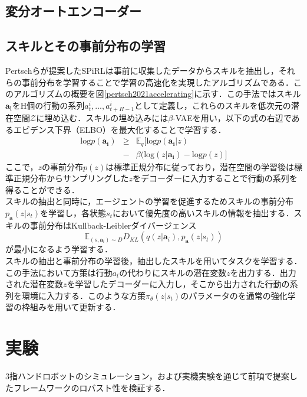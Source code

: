 \documentclass[dvipdfmx]{ampbt_nomag}
\begin{document}
\subsection{変分オートエンコーダー}


\subsection{スキルとその事前分布の学習}
Pertschらが提案したSPiRLは事前に収集したデータからスキルを抽出し，それらの事前分布を学習することで学習の高速化を実現したアルゴリズムである\cite{pertsch2021accelerating}．このアルゴリズムの概要を図\ref{pertsch2021accelerating}に示す．この手法ではスキル$\boldsymbol{a_i}$をH個の行動の系列$a^i_t,...,a^i_{t+H-1}$として定義し，これらのスキルを低次元の潜在空間$\mathcal{Z}$に埋め込む．スキルの埋め込みには$\beta$-VAEを用い，以下の式の右辺であるエビデンス下界（ELBO）を最大化することで学習する．
\begin{eqnarray} 
\label{ELBO}
\text{log} p(\boldsymbol{a_i}) &\geq& \mathbb{E}_q [\text{log} p(\boldsymbol{a_i}|z)  \\ \nonumber
&-&\beta(\text{log}(z|\boldsymbol{a_i}) - \text{log}p(z)]
\end{eqnarray}
ここで，$z$の事前分布$p(z)$は標準正規分布に従っており，潜在空間の学習後は標準正規分布からサンプリングした$z$をデコーダーに入力することで行動の系列を得ることができる．\\
スキルの抽出と同時に，エージェントの学習を促進するためスキルの事前分布$p_{\boldsymbol{a}}(z|s_t)$を学習し，各状態$s_t$において優先度の高いスキルの情報を抽出する．スキルの事前分布はKullback-Leiblerダイバージェンス
\begin{equation}
    \mathbb{E}_{(s,\boldsymbol{a}_i)\sim D}D_{KL}\left(q(z|\boldsymbol{a}_i),p_{\boldsymbol{a}}(z|s_t)\right)
\end{equation}
が最小になるよう学習する．\\
スキルの抽出と事前分布の学習後，抽出したスキルを用いてタスクを学習する．この手法において方策は行動$a_t$の代わりにスキルの潜在変数$z$を出力する．出力された潜在変数$z$を学習したデコーダーに入力し，そこから出力された行動の系列を環境に入力する．このような方策$\pi_\theta(z|s_t)$のパラメータのを通常の強化学習の枠組みを用いて更新する．


\section{実験}\label{sec-experiment}
3指ハンドロボットのシミュレーション，および実機実験を通じて前項で提案したフレームワークのロバスト性を検証する．
\end{document}
